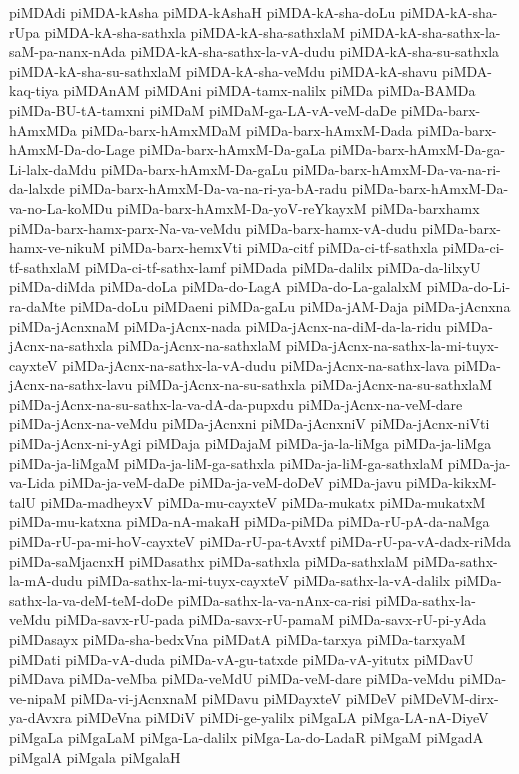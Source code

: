 {piMDAdi
piMDA-kAsha
piMDA-kAshaH
piMDA-kA-sha-doLu
piMDA-kA-sha-rUpa
piMDA-kA-sha-sathxla
piMDA-kA-sha-sathxlaM
piMDA-kA-sha-sathx-la-saM-pa-nanx-nAda
piMDA-kA-sha-sathx-la-vA-dudu
piMDA-kA-sha-su-sathxla
piMDA-kA-sha-su-sathxlaM
piMDA-kA-sha-veMdu
piMDA-kA-shavu
piMDA-kaq-tiya
piMDAnAM
piMDAni
piMDA-tamx-nalilx
piMDa
piMDa-BAMDa
piMDa-BU-tA-tamxni
piMDaM
piMDaM-ga-LA-vA-veM-daDe
piMDa-barx-hAmxMDa
piMDa-barx-hAmxMDaM
piMDa-barx-hAmxM-Dada
piMDa-barx-hAmxM-Da-do-Lage
piMDa-barx-hAmxM-Da-gaLa
piMDa-barx-hAmxM-Da-ga-Li-lalx-daMdu
piMDa-barx-hAmxM-Da-gaLu
piMDa-barx-hAmxM-Da-va-na-ri-da-lalxde
piMDa-barx-hAmxM-Da-va-na-ri-ya-bA-radu
piMDa-barx-hAmxM-Da-va-no-La-koMDu
piMDa-barx-hAmxM-Da-yoV-reYkayxM
piMDa-barxhamx
piMDa-barx-hamx-parx-Na-va-veMdu
piMDa-barx-hamx-vA-dudu
piMDa-barx-hamx-ve-nikuM
piMDa-barx-hemxVti
piMDa-citf
piMDa-ci-tf-sathxla
piMDa-ci-tf-sathxlaM
piMDa-ci-tf-sathx-lamf
piMDada
piMDa-dalilx
piMDa-da-lilxyU
piMDa-diMda
piMDa-doLa
piMDa-do-LagA
piMDa-do-La-galalxM
piMDa-do-Li-ra-daMte
piMDa-doLu
piMDaeni
piMDa-gaLu
piMDa-jAM-Daja
piMDa-jAcnxna
piMDa-jAcnxnaM
piMDa-jAcnx-nada
piMDa-jAcnx-na-diM-da-la-ridu
piMDa-jAcnx-na-sathxla
piMDa-jAcnx-na-sathxlaM
piMDa-jAcnx-na-sathx-la-mi-tuyx-cayxteV
piMDa-jAcnx-na-sathx-la-vA-dudu
piMDa-jAcnx-na-sathx-lava
piMDa-jAcnx-na-sathx-lavu
piMDa-jAcnx-na-su-sathxla
piMDa-jAcnx-na-su-sathxlaM
piMDa-jAcnx-na-su-sathx-la-va-dA-da-pupxdu
piMDa-jAcnx-na-veM-dare
piMDa-jAcnx-na-veMdu
piMDa-jAcnxni
piMDa-jAcnxniV
piMDa-jAcnx-niVti
piMDa-jAcnx-ni-yAgi
piMDaja
piMDajaM
piMDa-ja-la-liMga
piMDa-ja-liMga
piMDa-ja-liMgaM
piMDa-ja-liM-ga-sathxla
piMDa-ja-liM-ga-sathxlaM
piMDa-ja-va-Lida
piMDa-ja-veM-daDe
piMDa-ja-veM-doDeV
piMDa-javu
piMDa-kikxM-talU
piMDa-madheyxV
piMDa-mu-cayxteV
piMDa-mukatx
piMDa-mukatxM
piMDa-mu-katxna
piMDa-nA-makaH
piMDa-piMDa
piMDa-rU-pA-da-naMga
piMDa-rU-pa-mi-hoV-cayxteV
piMDa-rU-pa-tAvxtf
piMDa-rU-pa-vA-dadx-riMda
piMDa-saMjacnxH
piMDasathx
piMDa-sathxla
piMDa-sathxlaM
piMDa-sathx-la-mA-dudu
piMDa-sathx-la-mi-tuyx-cayxteV
piMDa-sathx-la-vA-dalilx
piMDa-sathx-la-va-deM-teM-doDe
piMDa-sathx-la-va-nAnx-ca-risi
piMDa-sathx-la-veMdu
piMDa-savx-rU-pada
piMDa-savx-rU-pamaM
piMDa-savx-rU-pi-yAda
piMDasayx
piMDa-sha-bedxVna
piMDatA
piMDa-tarxya
piMDa-tarxyaM
piMDati
piMDa-vA-duda
piMDa-vA-gu-tatxde
piMDa-vA-yitutx
piMDavU
piMDava
piMDa-veMba
piMDa-veMdU
piMDa-veM-dare
piMDa-veMdu
piMDa-ve-nipaM
piMDa-vi-jAcnxnaM
piMDavu
piMDayxteV
piMDeV
piMDeVM-dirx-ya-dAvxra
piMDeVna
piMDiV
piMDi-ge-yalilx
piMgaLA
piMga-LA-nA-DiyeV
piMgaLa
piMgaLaM
piMga-La-dalilx
piMga-La-do-LadaR
piMgaM
piMgadA
piMgalA
piMgala
piMgalaH
}
